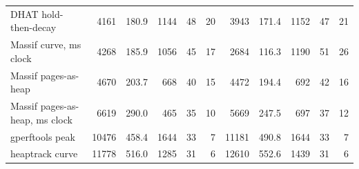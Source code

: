 \begin{tabular}{lrrrrrrrrrr}
DHAT hold-then-decay & 4161 & 180.9 & 1144 & 48 & 20 & 3943 & 171.4 & 1152 & 47 & 21 \\
Massif curve, ms clock & 4268 & 185.9 & 1056 & 45 & 17 & 2684 & 116.3 & 1190 & 51 & 26 \\
Massif pages-as-heap & 4670 & 203.7 & 668 & 40 & 15 & 4472 & 194.4 & 692 & 42 & 16 \\
Massif pages-as-heap, ms clock & 6619 & 290.0 & 465 & 35 & 10 & 5669 & 247.5 & 697 & 37 & 12 \\
gperftools peak & 10476 & 458.4 & 1644 & 33 & 7 & 11181 & 490.8 & 1644 & 33 & 7 \\
heaptrack curve & 11778 & 516.0 & 1285 & 31 & 6 & 12610 & 552.6 & 1439 & 31 & 6 \\
\bottomrule
\end{tabular}
